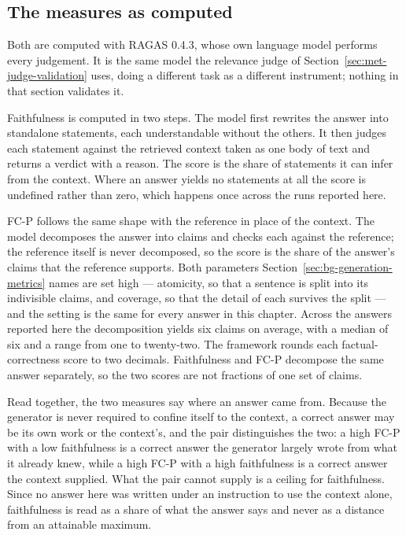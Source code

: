 \subsection*{The measures as computed}

Both are computed with RAGAS 0.4.3, whose own language model performs every judgement. It is the
same model the relevance judge of Section~\ref{sec:met-judge-validation} uses, doing a different task
as a different instrument; nothing in that section validates it.

Faithfulness is computed in two steps. The model first rewrites the answer into standalone
statements, each understandable without the others. It then judges each statement against the
retrieved context taken as one body of text and returns a verdict with a reason. The score is the
share of statements it can infer from the context. Where an answer yields no statements at all the
score is undefined rather than zero, which happens once across the runs reported here.

FC-P follows the same shape with the reference in place of the context. The model decomposes the
answer into claims and checks each against the reference; the reference itself is never decomposed,
so the score is the share of the answer's claims that the reference supports. Both parameters
Section~\ref{sec:bg-generation-metrics} names are set high --- atomicity, so that a sentence is split
into its indivisible claims, and coverage, so that the detail of each survives the split --- and the
setting is the same for every answer in this chapter. Across the answers reported here the
decomposition yields six claims on average, with a median of six and a range from one to twenty-two.
The framework rounds each factual-correctness score to two decimals. Faithfulness and FC-P decompose
the same answer separately, so the two scores are not fractions of one set of claims.

Read together, the two measures say where an answer came from. Because the generator is never
required to confine itself to the context, a correct answer may be its own work or the context's, and
the pair distinguishes the two: a high FC-P with a low faithfulness is a correct answer the generator
largely wrote from what it already knew, while a high FC-P with a high faithfulness is a correct
answer the context supplied. What the pair cannot supply is a ceiling for faithfulness. Since no
answer here was written under an instruction to use the context alone, faithfulness is read as a
share of what the answer says and never as a distance from an attainable maximum.

